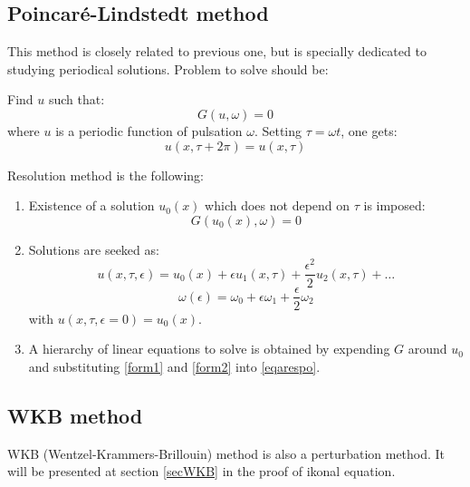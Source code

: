 \documentclass[12pt]{book}
\begin{document}
\subsection{Poincar\'e-Lindstedt method}
This method is closely related to previous one, but is specially dedicated to
studying periodical solutions.
Problem to solve should be:
\begin{prob}
Find $u$ such that:
\begin{equation}\label{eqarespo}
G(u,\omega)=0
\end{equation}
where $u$ is a periodic function of pulsation $\omega$. Setting $\tau=\omega
t$, one gets:
\begin{equation}
u(x,\tau +2\pi)=u(x,\tau)
\end{equation}
\end{prob}
Resolution method is the following:
\begin{alg}
\begin{enumerate}
\item Existence of a solution $u_0(x)$ which does not depend on $\tau$ is
  imposed: 
\begin{equation}
G(u_0(x),\omega)=0
\label{fix}
\end{equation}
\item 
Solutions are seeked as:
\begin{equation}
u(x,\tau,\epsilon)=u_0(x)+\epsilon
u_1(x,\tau)+\frac{\epsilon^2}{2}u_2(x,\tau)+\dots
\label{form1}
\end{equation}
\begin{equation}
\omega(\epsilon)=\omega_0+\epsilon\omega_1+\frac{\epsilon}{2}\omega_2
\label{form2}
\end{equation}
with  $u(x,\tau,\epsilon=0)=u_0(x)$.
\item A hierarchy of linear equations to solve is obtained by expending $G$ around $u_0$and substituting \ref{form1} and \ref{form2} into \ref{eqarespo}.
\end{enumerate}
\end{alg}


\subsection{WKB method}\label{mathsecWKB}
 WKB (Wentzel-Krammers-Brillouin) method is also a perturbation
method. It will be presented at section
\ref{secWKB} in the proof of ikonal equation.
\end{document}
